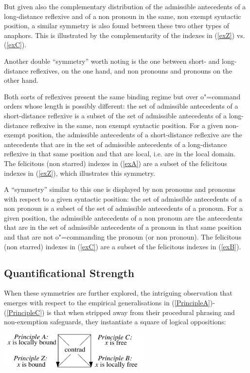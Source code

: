 \documentclass[output=paper
,modfonts
,nonflat]{langsci/langscibook}
\begin{document}
But given also the complementary 
distribution of the admissible antecedents of a long-distance
reflexive and of a non pronoun in the same, non exempt syntactic position,
a similar symmetry is also found between these two other types of anaphors.
This is illustrated by the complementarity of the indexes in (\ref{exZ}) vs. (\ref{exC}).

Another double ``symmetry'' worth noting is the one
between short- and long-distance reflexives, on the one hand,
and non pronouns and pronouns on the other hand.

Both sorts
of reflexives present the same binding regime but over
o"=command orders whose length is possibly different: the set
of admissible antecedents of a short-distance reflexive is a subset
of the set of admissible antecedents of a long-distance reflexive
in the same, non exempt syntactic position. For a given non-exempt position,
the admissible antecedents of a short-distance reflexive are the antecedents 
that are in the set of admissible antecedents of a long-distance reflexive
in that same position and that are local, i.e. are in the local domain. The felicitous (non starred) indexes 
in (\ref{exA}) are a subset of the felicitous indexes in (\ref{exZ}), which illustrates this symmetry.

A ``symmetry'' similar to
this one is displayed by non pronouns and pronouns with respect
to a given syntactic position: the set of admissible antecedents of
a non pronoun is a subset of the set of admissible antecedents of
a pronoun. For a given position,
the admissible antecedents of a non pronoun are the antecedents 
that are in the set of admissible antecedents of a pronoun
in that same position and that are not o"=commanding the pronoun (or non pronoun).
The felicitous (non starred) indexes 
in (\ref{exC}) are a subset of the felicitous indexes in (\ref{exB}).

\subsection{Quantificational Strength \label{quantAnaphor}}

When these symmetries are further explored, 
the intriguing observation that emerges 
with respect to the empirical generalisations in
(\ref{PrincipleA})-(\ref{PrincipleC}) is that when stripped away from
their procedural phrasing and non-exemption safeguards,
they instantiate a square of logical oppositions:

\begin{exe}
\ex
\label{bindingSquareOpposition}
\end{exe}
\vspace{-7mm}
\centerline{\includegraphics[width=18pc]{figures/bindingSquareOpposition.pdf}}
\end{document}
